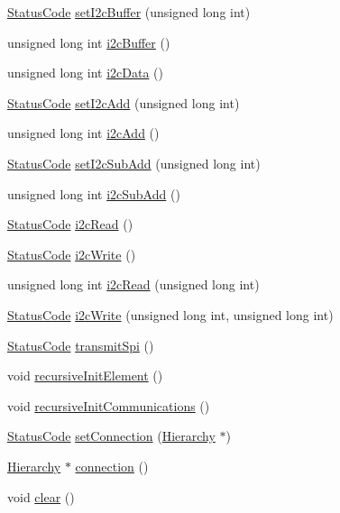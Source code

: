 \begin{DoxyCompactItemize}
\hyperlink{classStatusCode}{StatusCode} \hyperlink{classFePGA_aaf52ed549f6b79d53f49c3f85c5fbad2}{setI2cBuffer} (unsigned long int)
\item 
unsigned long int \hyperlink{classFePGA_a5577463c8478cb6d54fc3c75b26cd819}{i2cBuffer} ()
\item 
unsigned long int \hyperlink{classFePGA_a9c261a09d323c07ec4b9e925d4dfc353}{i2cData} ()
\item 
\hyperlink{classStatusCode}{StatusCode} \hyperlink{classFePGA_a2da860f836e04ecc54056d0bf8cc8f98}{setI2cAdd} (unsigned long int)
\item 
unsigned long int \hyperlink{classFePGA_a26b690b730b5f668ab28fb8deab8326b}{i2cAdd} ()
\item 
\hyperlink{classStatusCode}{StatusCode} \hyperlink{classFePGA_a37c1ee5bf89667c641f321479697166f}{setI2cSubAdd} (unsigned long int)
\item 
unsigned long int \hyperlink{classFePGA_ab51ac1c71e33f7444212de0e89e1f436}{i2cSubAdd} ()
\item 
\hyperlink{classStatusCode}{StatusCode} \hyperlink{classFePGA_a939c5c23077210a2ad851a12694657a4}{i2cRead} ()
\item 
\hyperlink{classStatusCode}{StatusCode} \hyperlink{classFePGA_a27b9c9bb486cea35b1bbcac5da96f527}{i2cWrite} ()
\item 
unsigned long int \hyperlink{classFePGA_adf1c43786131d0f500b4662a877229c7}{i2cRead} (unsigned long int)
\item 
\hyperlink{classStatusCode}{StatusCode} \hyperlink{classFePGA_a45e1cfdf1f303f3958bf6a83c4e8039b}{i2cWrite} (unsigned long int, unsigned long int)
\item 
\hyperlink{classStatusCode}{StatusCode} \hyperlink{classFePGA_ac7698a9f59f7290a6bb648030976597f}{transmitSpi} ()
\item 
void \hyperlink{classElement_a3c0abcb36f8906688bb7e32608df7086}{recursiveInitElement} ()
\item 
void \hyperlink{classElement_a82119ed37dff76508a2746a853ec35ba}{recursiveInitCommunications} ()
\item 
\hyperlink{classStatusCode}{StatusCode} \hyperlink{classElement_ab476b4b1df5954141ceb14f072433b89}{setConnection} (\hyperlink{classHierarchy}{Hierarchy} $\ast$)
\item 
\hyperlink{classHierarchy}{Hierarchy} $\ast$ \hyperlink{classElement_af57444353c1ddf9fa0109801e97debf7}{connection} ()
\item 
void \hyperlink{classHierarchy_af4d43b0765b402670eed2d62c73405af}{clear} ()

\end{DoxyCompactItemize}

